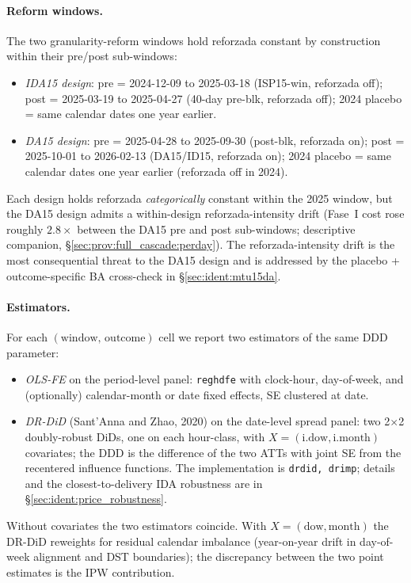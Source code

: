 \documentclass[11pt,a4paper]{article}
\begin{document}
\paragraph{Reform windows.} The two granularity-reform windows hold reforzada constant by construction within their pre/post sub-windows:
\begin{itemize}
\item \emph{IDA15 design}: pre = 2024-12-09 to 2025-03-18 (ISP15-win, reforzada off); post = 2025-03-19 to 2025-04-27 (40-day pre-blk, reforzada off); 2024 placebo = same calendar dates one year earlier.
\item \emph{DA15 design}: pre = 2025-04-28 to 2025-09-30 (post-blk, reforzada on); post = 2025-10-01 to 2026-02-13 (DA15/ID15, reforzada on); 2024 placebo = same calendar dates one year earlier (reforzada off in 2024).
\end{itemize}
Each design holds reforzada \emph{categorically} constant within the 2025 window, but the DA15 design admits a within-design reforzada-intensity drift (Fase~I cost rose roughly $2.8\times$ between the DA15 pre and post sub-windows; descriptive companion, \S\ref{sec:prov:full_cascade:perday}). The reforzada-intensity drift is the most consequential threat to the DA15 design and is addressed by the placebo + outcome-specific BA cross-check in \S\ref{sec:ident:mtu15da}.

\paragraph{Estimators.} For each $(\text{window},\,\text{outcome})$ cell we report two estimators of the same DDD parameter:
\begin{itemize}
\item \emph{OLS-FE} on the period-level panel: \texttt{reghdfe} with clock-hour, day-of-week, and (optionally) calendar-month or date fixed effects, SE clustered at date.
\item \emph{DR-DiD} (Sant'Anna and Zhao, 2020) on the date-level spread panel: two 2$\times$2 doubly-robust DiDs, one on each hour-class, with $X = (\text{i.dow}, \text{i.month})$ covariates; the DDD is the difference of the two ATTs with joint SE from the recentered influence functions. The implementation is \texttt{drdid, drimp}; details and the closest-to-delivery IDA robustness are in \S\ref{sec:ident:price_robustness}.
\end{itemize}
Without covariates the two estimators coincide. With $X = (\text{dow}, \text{month})$ the DR-DiD reweights for residual calendar imbalance (year-on-year drift in day-of-week alignment and DST boundaries); the discrepancy between the two point estimates is the IPW contribution.
\end{document}
